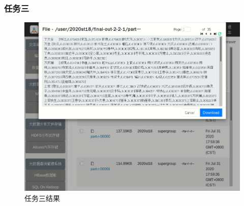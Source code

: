 \documentclass[a4paper,UTF8]{article}
\numberwithin{equation}{section}
\begin{document}
\subsubsection{任务三}
\begin{figure}[H]
    \centering
    \includegraphics[width = 15cm]{task3-1-output.png}
    \caption{任务三结果}
\end{figure}
\end{document}
